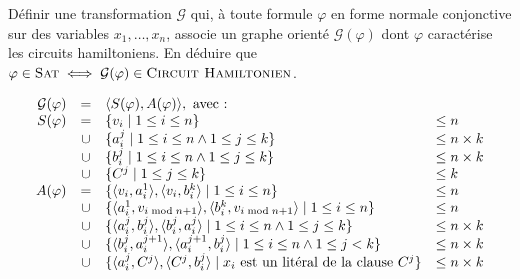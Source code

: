 \begin{exercice}[\textsc{Circuit Hamiltonien} est NP-complet%
    \footnote{Vidéo détaillée de la réduction de \textsc{3-SAT} à \textsc{Cycle Hamiltonien} : \url{https://www.youtube.com/watch?v=OHnX-R_SBpM}}]
  \ifcorrection{\newpage}
  \begin{questions}
  \item Définir une transformation $\mathcal{G}$ qui, à toute formule $\varphi$
    en forme normale conjonctive sur des variables $x_1,\dots,x_n$, associe un graphe orienté $\mathcal{G}(\varphi)$
    dont $\varphi$ caractérise les circuits hamiltoniens.
    En déduire que $\varphi \in \textsc{Sat} \iff \mathcal{G}(\varphi) \in \textsc{Circuit Hamiltonien}$.
  \end{questions}
  \begin{corrections}
    $$
    \begin{array}{rcl@{\quad}l}
      \mathcal{G}(\varphi) &=& \langle S(\varphi), A(\varphi) \rangle, \text{ avec :} \\
      S(\varphi) &=&  \{ v_i   \mid 1 \le i \le n  \}                                                                                                     & \le n\\
      &\cup& \{ a_i^j \mid 1 \le i \le n \land 1 \le j \le k\}                                                                                            & \le n \times k\\
      &\cup& \{ b_i^j \mid 1 \le i \le n \land 1 \le j \le k\}                                                                                            & \le n \times k\\
      &\cup& \{ C^j   \mid 1 \le j \le k\}                                                                                                                 & \le k\\ 
      A(\varphi) &=&  \{ \langle v_i, a_i^1 \rangle, \langle v_i, b_i^k  \rangle             \mid 1 \le i \le n  \}                                        & \le n\\
      &\cup& \{ \langle a_i^1, v_{i \bmod n + 1} \rangle, \langle b_i^k, v_{i \bmod n + 1} \rangle \mid 1 \le i \le n  \}                                        & \le n\\
      &\cup& \{ \langle a_i^j, b_i^j \rangle,          \langle b_i^j, a_i^j \rangle          \mid 1 \le i \le n  \land 1 \le j \le k \}                    & \le n \times k\\
      &\cup& \{ \langle b_i^j, a_i^{j+1} \rangle,       \langle a_i^{j+1}, b_i^j \rangle       \mid 1 \le i \le n  \land 1 \le j < k \}                      & \le n \times k\\
      &\cup& \{ \langle a_i^j, C^j \rangle,            \langle C^j, b_i^j \rangle            \mid x_i \text{ est un litéral de la clause } C^j \}          & \le n \times k\\

\end{array}$$
\end{corrections}
\end{exercice}

